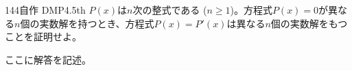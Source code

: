\begin{prob}{144}{}{自作 DMP4.5th}
 $P(x)$は$n$次の整式である ($n\ge 1$)。方程式$P(x)=0$が異なる$n$個の実数解を持つとき、方程式$P(x)=P'(x)$は異なる$n$個の実数解をもつことを証明せよ。
\end{prob}
ここに解答を記述。